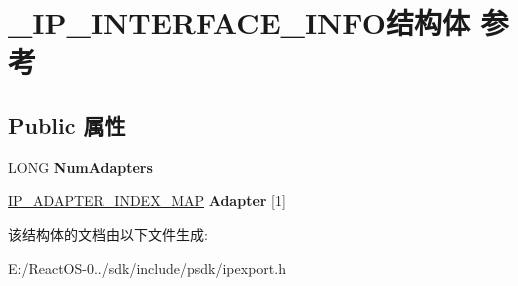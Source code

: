 \hypertarget{struct___i_p___i_n_t_e_r_f_a_c_e___i_n_f_o}{}\section{\+\_\+\+I\+P\+\_\+\+I\+N\+T\+E\+R\+F\+A\+C\+E\+\_\+\+I\+N\+F\+O结构体 参考}
\label{struct___i_p___i_n_t_e_r_f_a_c_e___i_n_f_o}
\subsection*{Public 属性}
\begin{DoxyCompactItemize}
\item 
\mbox{\label{struct___i_p___i_n_t_e_r_f_a_c_e___i_n_f_o_a1f68b8623dc3bdfcad7601cc6e555098}} 
L\+O\+NG {\bfseries Num\+Adapters}
\item 
\mbox{\label{struct___i_p___i_n_t_e_r_f_a_c_e___i_n_f_o_a9f4ffcef5f4864558f004675de81e5b7}} 
\hyperlink{struct___i_p___a_d_a_p_t_e_r___i_n_d_e_x___m_a_p}{I\+P\+\_\+\+A\+D\+A\+P\+T\+E\+R\+\_\+\+I\+N\+D\+E\+X\+\_\+\+M\+AP} {\bfseries Adapter} \mbox{[}1\mbox{]}
\end{DoxyCompactItemize}


该结构体的文档由以下文件生成\+:\begin{DoxyCompactItemize}
\item 
E\+:/\+React\+O\+S-\/0../sdk/include/psdk/ipexport.\+h\end{DoxyCompactItemize}
